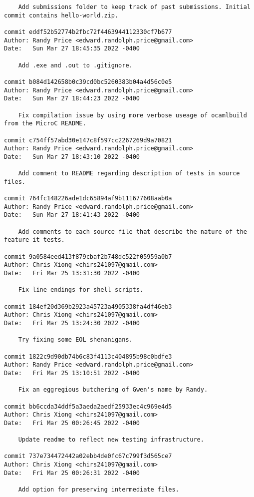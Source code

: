 {\begin{verbatim}
    Add submissions folder to keep track of past submissions. Initial commit contains hello-world.zip.

commit eddf52b52774b2fbc72f4463944112330cf7b677
Author: Randy Price <edward.randolph.price@gmail.com>
Date:   Sun Mar 27 18:45:35 2022 -0400

    Add .exe and .out to .gitignore.

commit b084d142658b0c39cd0bc5260383b04a4d56c0e5
Author: Randy Price <edward.randolph.price@gmail.com>
Date:   Sun Mar 27 18:44:23 2022 -0400

    Fix compilation issue by using more verbose useage of ocamlbuild from the MicroC README.

commit c754ff57abd30e147c8f597cc2267269d9a70821
Author: Randy Price <edward.randolph.price@gmail.com>
Date:   Sun Mar 27 18:43:10 2022 -0400

    Add comment to README regarding description of tests in source files.

commit 764fc148226ade1dc65894af9b111677608aab0a
Author: Randy Price <edward.randolph.price@gmail.com>
Date:   Sun Mar 27 18:41:43 2022 -0400

    Add comments to each source file that describe the nature of the feature it tests.

commit 9a0584eed413f879cbaf2b748dc522f05959a0b7
Author: Chris Xiong <chirs241097@gmail.com>
Date:   Fri Mar 25 13:31:30 2022 -0400

    Fix line endings for shell scripts.

commit 184ef20d369b2923a45723a4905338fa4df46eb3
Author: Chris Xiong <chirs241097@gmail.com>
Date:   Fri Mar 25 13:24:30 2022 -0400

    Try fixing some EOL shenanigans.

commit 1822c9d90db74b6c83f4113c404895b98c0bdfe3
Author: Randy Price <edward.randolph.price@gmail.com>
Date:   Fri Mar 25 13:10:51 2022 -0400

    Fix an eggregious butchering of Gwen's name by Randy.

commit bb6ccda34ddf5a3aeda2aedf25933ec4c969e4d5
Author: Chris Xiong <chirs241097@gmail.com>
Date:   Fri Mar 25 00:26:45 2022 -0400

    Update readme to reflect new testing infrastructure.

commit 737e734472442a02ebb4de0fc67c799f3d565ce7
Author: Chris Xiong <chirs241097@gmail.com>
Date:   Fri Mar 25 00:26:31 2022 -0400

    Add option for preserving intermediate files.


\end{verbatim}}
